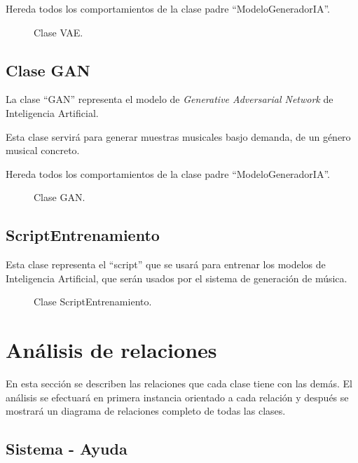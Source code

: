 Hereda todos los comportamientos de la clase padre ``ModeloGeneradorIA''.

\begin{figure}[H]
  \centering
  
  \caption{Clase VAE.}
\end{figure}

\subsection{Clase GAN}

La clase ``GAN'' representa el modelo de \emph{Generative Adversarial Network} de Inteligencia Artificial.

Esta clase servirá para generar muestras musicales basjo demanda, de un género musical concreto.

Hereda todos los comportamientos de la clase padre ``ModeloGeneradorIA''.

\begin{figure}[H]
  \centering
  
  \caption{Clase GAN.}
\end{figure}

\subsection{ScriptEntrenamiento}

Esta clase representa el ``script'' que se usará para entrenar los modelos de Inteligencia Artificial, que serán usados por el sistema de generación de música.

\begin{figure}[H]
  \centering
  
  \caption{Clase ScriptEntrenamiento.}
\end{figure}


\section{Análisis de relaciones}

En esta sección se describen las relaciones que cada clase tiene con las demás. El análisis se efectuará en primera instancia orientado a cada relación y después se mostrará un diagrama de relaciones completo de todas las clases.

\subsection{Sistema - Ayuda}

